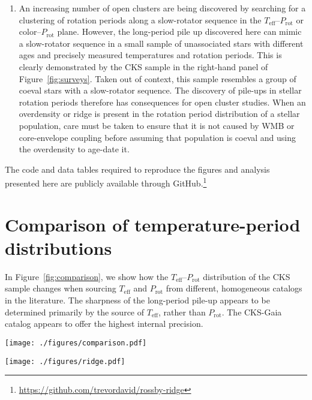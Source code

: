 \documentclass[linenumbers,tighten,trackchanges,twocolumn]{aastex631}
\newcommand{\teff}{\ensuremath{T_{\mathrm{eff}}}\xspace}
\newcommand{\prot}{\ensuremath{P_\mathrm{rot}}\xspace}
\begin{document}
\begin{enumerate}
    \item An increasing number of open clusters are being discovered by searching for a clustering of rotation periods along a slow-rotator sequence in the \teff–\prot or color–\prot plane. However, the long-period pile up discovered here can mimic a slow-rotator sequence in a small sample of unassociated stars with different ages and precisely measured temperatures and rotation periods. This is clearly demonstrated by the CKS sample in the right-hand panel of Figure~\ref{fig:surveys}. Taken out of context, this sample resembles a group of coeval stars with a slow-rotator sequence. The discovery of pile-ups in stellar rotation periods therefore has consequences for open cluster studies. When an overdensity or ridge is present in the rotation period distribution of a stellar population, care must be taken to ensure that it is not caused by WMB or core-envelope coupling before assuming that population is coeval and using the overdensity to age-date it. 
    
\end{enumerate}

The code and data tables required to reproduce the figures and analysis presented here are publicly available through GitHub.\footnote{\url{https://github.com/trevordavid/rossby-ridge}}


\appendix
\section{Comparison of temperature-period distributions}\label{app:teffprot}
In Figure~\ref{fig:comparison}, we show how the \teff--\prot distribution of the CKS sample changes when sourcing \teff and \prot from different, homogeneous catalogs in the literature. The sharpness of the long-period pile-up appears to be determined primarily by the source of \teff, rather than \prot. The CKS-Gaia catalog \citep{Fulton2018} appears to offer the highest internal precision.  


\begin{figure*}
    \centering
    \texttt{[image: ./figures/comparison.pdf]}
    \caption{Comparison of the \teff--\prot distribution for the CKS sample using rotation periods and \teff from the sources indicated by the axes labels.}
    \label{fig:comparison}
\end{figure*}

\begin{figure*}
    \centering
    \texttt{[image: ./figures/ridge.pdf]}
    \caption{The \teff-\prot plane for the CKS sample. Point colors are scaled to the CKS ages determined from isochrone fitting. The source of \prot is denoted above each panel, where \citet{David2021} is a compilation of vetted periods, rather than a source of original measurements. The black trapezoid indicates the approximate area of the ridge. The grey curves indicate empirical cluster sequences from \citet{Curtis2020}, corresponding to ages of $\sim$2.7, 1, 0.67, and 0.12~Gyr from top to bottom.}
    \label{fig:ridge}
\end{figure*}
\end{document}
